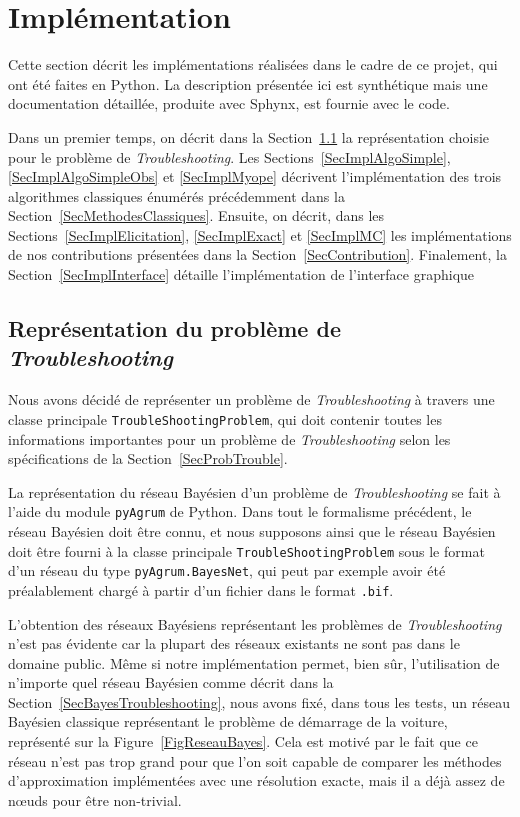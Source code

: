 \documentclass[a4paper,11pt]{article}
\theoremstyle{plain}
\theoremstyle{definition}
\begin{document}
\section{Implémentation}
\label{SecImplementation}

Cette section décrit les implémentations réalisées dans le cadre de ce projet, qui ont été faites en Python. La description présentée ici est synthétique mais une documentation détaillée, produite avec Sphynx, est fournie avec le code.

Dans un premier temps, on décrit dans la Section~\ref{SecImplRepresentation} la représentation choisie pour le problème de \emph{Troubleshooting}. Les Sections~\ref{SecImplAlgoSimple}, \ref{SecImplAlgoSimpleObs} et \ref{SecImplMyope} décrivent l'implémentation des trois algorithmes classiques énumérés précédemment dans la Section~\ref{SecMethodesClassiques}. Ensuite, on décrit, dans les Sections~\ref{SecImplElicitation}, \ref{SecImplExact} et \ref{SecImplMC} les implémentations de nos contributions présentées dans la Section~\ref{SecContribution}. Finalement, la Section~\ref{SecImplInterface} détaille l'implémentation de l'interface graphique

\subsection{Représentation du problème de \emph{Troubleshooting}}
\label{SecImplRepresentation}

Nous avons décidé de représenter un problème de \emph{Troubleshooting} à travers une classe principale \texttt{TroubleShootingProblem}, qui doit contenir toutes les informations importantes pour un problème de \emph{Troubleshooting} selon les spécifications de la Section~\ref{SecProbTrouble}.

La représentation du réseau Bayésien d'un problème de \emph{Troubleshooting} se fait à l'aide du module \texttt{pyAgrum} de Python. Dans tout le formalisme précédent, le réseau Bayésien doit être connu, et nous supposons ainsi que le réseau Bayésien doit être fourni à la classe principale \texttt{TroubleShootingProblem} sous le format d'un réseau du type \texttt{pyAgrum.BayesNet}, qui peut par exemple avoir été préalablement chargé à partir d'un fichier dans le format \texttt{.bif}.

L'obtention des réseaux Bayésiens représentant les problèmes de \emph{Troubleshooting} n'est pas évidente car la plupart des réseaux existants ne sont pas dans le domaine public. Même si notre implémentation permet, bien sûr, l'utilisation de n'importe quel réseau Bayésien comme décrit dans la Section~\ref{SecBayesTroubleshooting}, nous avons fixé, dans tous les tests, un réseau Bayésien classique représentant le problème de démarrage de la voiture, représenté sur la Figure~\ref{FigReseauBayes}. Cela est motivé par le fait que ce réseau n'est pas trop grand pour que l'on soit capable de comparer les méthodes d'approximation implémentées avec une résolution exacte, mais il a déjà assez de nœuds pour être non-trivial.
\end{document}
